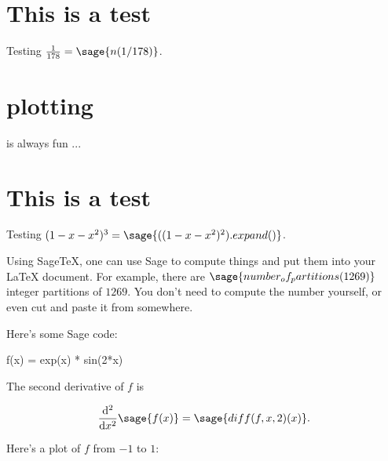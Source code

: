 \documentclass{article}
\begin{document}
\section{This is a test}

Testing $\frac{1}{178} = \sage{n(1/178)}$.

\section{plotting}

is always fun ...


\section{This is a test}

Testing $(1-x-x^2)^3 = \sage{((1-x-x^2)^2).expand()}$.

Using Sage\TeX, one can use Sage to compute things and put them into
your \LaTeX{} document. For example, there are
$\sage{number_of_partitions(1269)}$ integer partitions of $1269$.
You don't need to compute the number yourself, or even cut and paste
it from somewhere.

Here's some Sage code:

\begin{sageblock}
f(x) = exp(x) * sin(2*x)
\end{sageblock}

The second derivative of $f$ is

\[
  \frac{\mathrm{d}^{2}}{\mathrm{d}x^{2}} \sage{f(x)} =
  \sage{diff(f, x, 2)(x)}.
\]

Here's a plot of $f$ from $-1$ to $1$:

\end{document}
